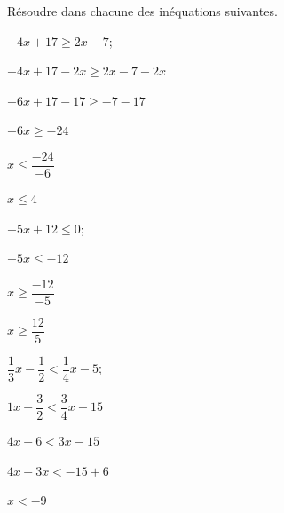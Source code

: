 \documentclass[11pt,a4paper]{article}  %
\begin{document}
Résoudre dans \R chacune des inéquations suivantes.
	\begin{enumMet}
		\item $-4 x +17 \geqslant 2x-7$;
		\begin{corrBox}
					$-4 x +17 -2x\geqslant 2x-7-2x$
					
					$-6 x +17 -17\geqslant -7-17$
					
					$-6 x\geqslant -24$
					
					$x\leqslant \dfrac{-24}{-6}$
					
					$x\leqslant 4$
					
					\framebox{$S=]-\infty\ ;\ 4]$}
		\end{corrBox}
		\item $-5 x+12 \leqslant 0$;
		\begin{corrBox}
			$-5 x\leqslant -12$
			
			$x\geqslant \dfrac{-12}{-5}$
			
			$x\geqslant \dfrac{12}{5}$	
			
			\framebox{$S=\left[\dfrac{12}{5}\ ;\ +\infty\right[$}				
		\end{corrBox}
		\item $\dfrac{1}{3} x-\dfrac{1}{2} < \dfrac{1}{4}x-5$;
		\begin{corrBox}
			$1x-\dfrac{3}{2} < \dfrac{3}{4}x-15$
			
			$4x-6 < 3x-15$
			
			$4x-3x<-15+6$
			
			$x<-9$
			
			\framebox{$S=]-\infty\ ;\ -9[$}
		\end{corrBox}
	\end{enumMet}

\end{document}
